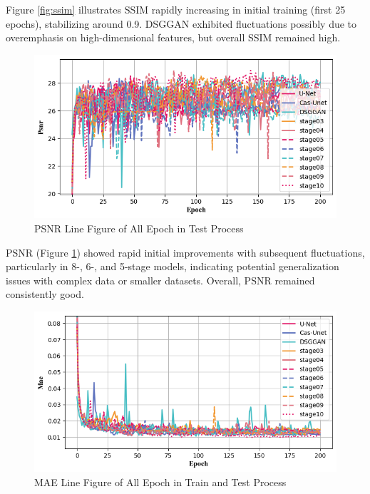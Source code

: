 \documentclass[twocolumn]{article}
\begin{document}
Figure \ref{fig:ssim} illustrates SSIM rapidly increasing in initial training (first 25 epochs), stabilizing around 0.9. DSGGAN exhibited fluctuations possibly due to overemphasis on high-dimensional features, but overall SSIM remained high.

\begin{figure}[h]
	\centering
	\includegraphics[width=1.0\linewidth]{u-net/lung/csv_lung_13_csv_img_2025_04_07_01_44_03/psnr_comparison}
	\caption[psnr]{PSNR Line Figure of All Epoch in Test Process}
	\label{fig:psnr}
\end{figure}

PSNR (Figure \ref{fig:psnr}) showed rapid initial improvements with subsequent fluctuations, particularly in 8-, 6-, and 5-stage models, indicating potential generalization issues with complex data or smaller datasets. Overall, PSNR remained consistently good.

\begin{figure}[h]
	\centering
	\includegraphics[width=1.0\linewidth]{u-net/lung/csv_lung_13_csv_img_2025_04_07_01_44_03/mae_comparison}
	\caption[mae]{MAE Line Figure of All Epoch in Train and Test Process}
	\label{fig:mae}
\end{figure}
\end{document}
